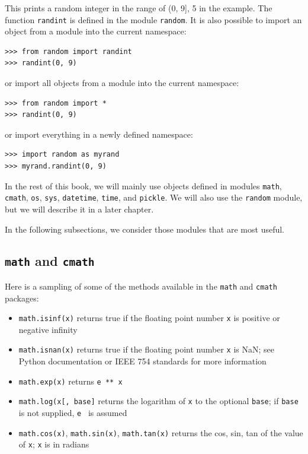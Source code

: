\documentclass[justified, sixbynine]{tufte-book}
\def\ft{\small\tt}
\theoremstyle{plain}%
\newtheorem * {corollary}{Corollary}
\theoremstyle{definition}
\theoremstyle{remark}
\newtheorem * {remark}{Remark}
\newtheorem * {note}{Note}
\begin{document}
\begin{fullwidth}
This prints a random integer in the range of (0, 9], 5 in the example. The function {\ft randint} is defined in the module {\ft random}. It is also possible to import an object from a module into the current namespace:
\begin{lstlisting}
>>> from random import randint
>>> randint(0, 9)
\end{lstlisting}
\noindent or import all objects from a module into the current namespace:
\begin{lstlisting}
>>> from random import * 
>>> randint(0, 9)
\end{lstlisting}
\noindent or import everything in a newly defined namespace:
\begin{lstlisting}
>>> import random as myrand
>>> myrand.randint(0, 9)
\end{lstlisting}

In the rest of this book, we will mainly use objects defined in modules {\ft math}, {\ft cmath}, {\ft os},  {\ft sys}, {\ft datetime}, {\ft time}, and {\ft pickle}. We will also use the {\ft random} module, but we will describe it in a later chapter.

In the following subsections, we consider those modules that are most useful.

\goodbreak\subsection{{\ft math} and {\ft cmath}}


Here is a sampling of some of the methods available in the {\ft math} and {\ft cmath} packages:
\begin{itemize}
\item {\ft math.isinf(x)} returns true if the floating point number {\ft x} is positive or negative infinity

\item {\ft math.isnan(x)} returns true if the floating point number {\ft x} is NaN; see Python documentation or IEEE 754 standards for more information

\item {\ft math.exp(x)} returns {\ft e ** x}

\item {\ft math.log(x[, base]} returns the logarithm of {\ft x} to the optional {\ft base}; if {\ft base} is not supplied, {\ft e } is assumed

\item {\ft math.cos(x)}, {\ft math.sin(x)}, {\ft math.tan(x)} returns the cos, sin, tan of the value of {\ft x};  {\ft x} is in radians


\end{itemize}
\end{fullwidth}
\end{document}
